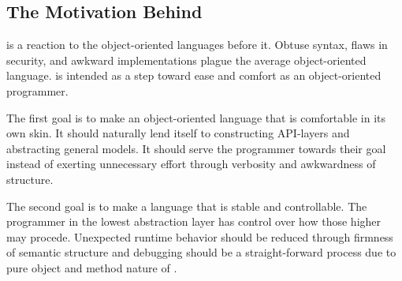 \subsection{The Motivation Behind \Lang{}}
\Lang{} is a reaction to the object-oriented languages before it. Obtuse syntax, flaws in security, and awkward implementations plague the average object-oriented language. \Lang{} is intended as a step toward ease and comfort as an object-oriented programmer.

The first goal is to make an object-oriented language that is comfortable in its own skin. It should naturally lend itself to constructing API-layers and abstracting general models. It should serve the programmer towards their goal instead of exerting unnecessary effort through verbosity and awkwardness of structure.

The second goal is to make a language that is stable and controllable. The programmer in the lowest abstraction layer has control over how those higher may procede. Unexpected runtime behavior should be reduced through firmness of semantic structure and debugging should be a straight-forward process due to pure object and method nature of \Lang{}.
